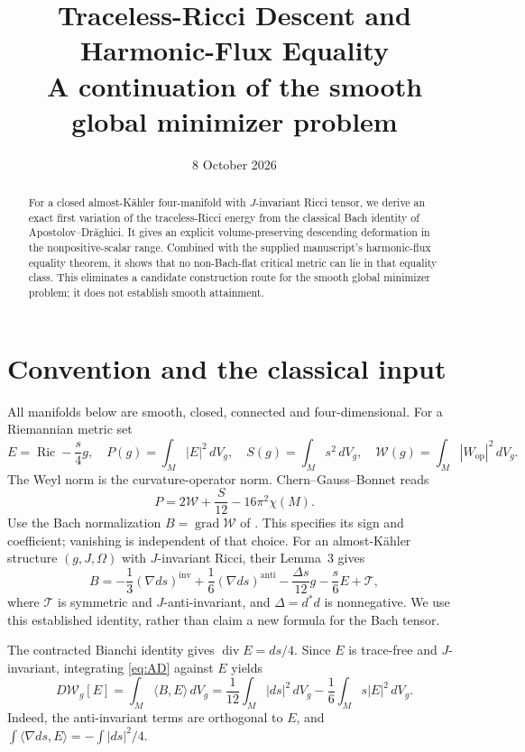 \documentclass[11pt]{article}
\title{Traceless-Ricci Descent and Harmonic-Flux Equality\\
\large A continuation of the smooth global minimizer problem}
\author{}
\date{8 October 2026}
\newcommand{\Ric}{\operatorname{Ric}}
\newcommand{\grad}{\operatorname{grad}}
\newcommand{\diver}{\operatorname{div}}
\newcommand{\dd}{\,dV_g}
\theoremstyle{remark}
\begin{document}
\maketitle
\begin{abstract}
For a closed almost-K\"ahler four-manifold with $J$-invariant Ricci tensor,
we derive an exact first variation of the traceless-Ricci energy from the
classical Bach identity of Apostolov--Dr\u aghici. It gives an explicit
volume-preserving descending deformation in the nonpositive-scalar range.
Combined with the supplied manuscript's harmonic-flux equality theorem,
it shows that no non-Bach-flat critical metric can lie in that equality
class. This eliminates a candidate construction route for the smooth
global minimizer problem; it does not establish smooth attainment.
\end{abstract}

\section{Convention and the classical input}

All manifolds below are smooth, closed, connected and four-dimensional.
For a Riemannian metric set
\[
 E=\Ric-\frac{s}{4}g,\quad
 P(g)=\int_M|E|^2\dd,\quad S(g)=\int_Ms^2\dd,\quad
 \mathcal W(g)=\int_M|W_{\mathrm{op}}|^2\dd.
\]
The Weyl norm is the curvature-operator norm. Chern--Gauss--Bonnet reads
\begin{equation}
 P=2\mathcal W+\frac{S}{12}-16\pi^2\chi(M).
 \label{eq:GB}
\end{equation}
Use the Bach normalization $B=\grad\mathcal W$ of
\cite[\S2.3, equation (15)]{AD}. This specifies its sign and coefficient;
vanishing is independent of that choice. For an almost-K\"ahler structure
$(g,J,\Omega)$ with $J$-invariant Ricci, their Lemma~3 gives
\begin{equation}
 B=-\frac13(\nabla ds)^{\mathrm{inv}}
   +\frac16(\nabla ds)^{\mathrm{anti}}
   -\frac{\Delta s}{12}g-\frac{s}{6}E+\mathcal T,
 \label{eq:AD}
\end{equation}
where $\mathcal T$ is symmetric and $J$-anti-invariant, and
$\Delta=d^*d$ is nonnegative. We use this established identity, rather
than claim a new formula for the Bach tensor.

The contracted Bianchi identity gives $\diver E=ds/4$. Since $E$ is
trace-free and $J$-invariant, integrating \eqref{eq:AD} against $E$ yields
\begin{equation}
 D\mathcal W_g[E]
 =\int_M\langle B,E\rangle\dd
 =\frac1{12}\int_M|ds|^2\dd-\frac16\int_Ms|E|^2\dd.
 \label{eq:B-pair}
\end{equation}
Indeed, the anti-invariant terms are orthogonal to $E$, and
$\int\langle\nabla ds,E\rangle=-\int|ds|^2/4$.
\end{document}
